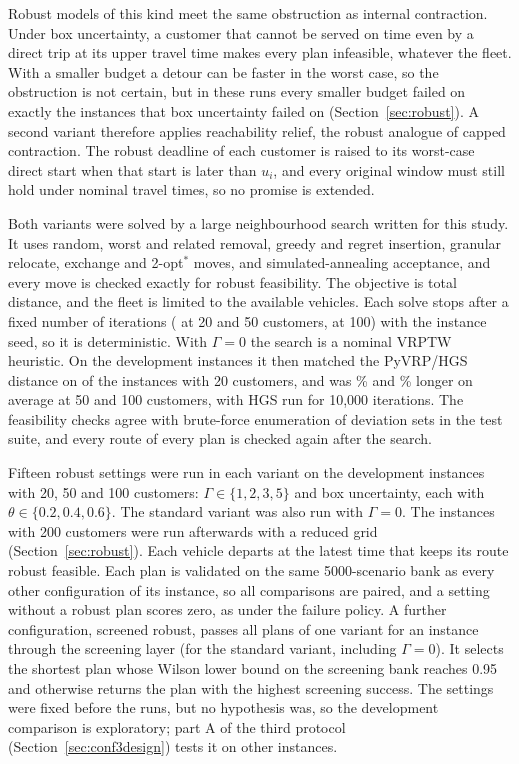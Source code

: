 \documentclass[11pt,a4paper]{article}
\begin{document}
Robust models of this kind meet the same obstruction as internal contraction.
Under box uncertainty, a customer that cannot be served on time even by a direct
trip at its upper travel time makes every plan infeasible, whatever the fleet.
With a smaller budget a detour can be faster in the worst case, so the
obstruction is not certain, but in these runs every smaller budget failed on
exactly the instances that box uncertainty failed on (Section~\ref{sec:robust}). A second variant therefore applies reachability
relief, the robust analogue of capped contraction. The robust deadline of each
customer is raised to its worst-case direct start when that start is later than
$u_i$, and every original window must still hold under nominal travel times, so
no promise is extended.

Both variants were solved by a large neighbourhood search written for this
study. It uses random, worst and related removal, greedy and regret insertion,
granular relocate, exchange and 2-opt$^*$ moves, and simulated-annealing
acceptance, and every move is checked exactly for robust feasibility. The
objective is total distance, and the fleet is limited to the available vehicles.
Each solve stops after a fixed number of iterations (\RobItersSmall{} at 20 and
50 customers, \RobItersHundred{} at 100) with the instance seed, so it is
deterministic. With $\Gamma=0$ the search is a nominal VRPTW heuristic. On the
development instances it then matched the PyVRP/HGS distance on
\RobBenchEqualTwenty{} of the \RobBenchCountTwenty{} instances with 20 customers,
and was \RobBenchGapFifty\% and \RobBenchGapHundred\% longer on average at 50 and
100 customers, with HGS run for 10,000 iterations. The feasibility checks agree
with brute-force enumeration of deviation sets in the test suite, and every route
of every plan is checked again after the search.

Fifteen robust settings were run in each variant on the development instances
with 20, 50 and 100 customers: $\Gamma\in\{1,2,3,5\}$ and box uncertainty, each
with $\theta\in\{0.2,0.4,0.6\}$. The standard variant was also run with
$\Gamma=0$. The instances with 200 customers were run afterwards with a reduced grid
(Section~\ref{sec:robust}). Each vehicle departs at the latest time that keeps its route robust
feasible. Each plan is validated on the same 5000-scenario bank as every other
configuration of its instance, so all comparisons are paired, and a setting
without a robust plan scores zero, as under the failure policy. A further
configuration, screened robust, passes all plans of one variant for an instance
through the screening layer (for the standard variant, including $\Gamma=0$). It
selects the shortest plan whose Wilson lower bound on the screening bank reaches
0.95 and otherwise returns the plan with the highest screening success. The
settings were fixed before the runs, but no hypothesis was, so the development
comparison is exploratory; part A of the third protocol
(Section~\ref{sec:conf3design}) tests it on other instances.
\end{document}

